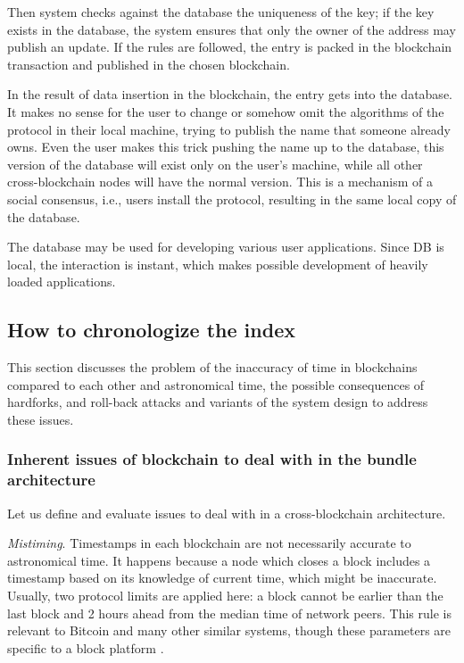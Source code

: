 \begin{multicols}{2}
Then system checks against the database the uniqueness of the key; if the key exists in the database, the system ensures that only the owner of the address may publish an update. If the rules are followed, the entry is packed in the blockchain transaction and published in the chosen blockchain.

In the result of data insertion in the blockchain, the entry gets into the database. It makes no sense for the user to change or somehow omit the algorithms of the protocol in their local machine, trying to publish the name that someone already owns. Even the user makes this trick pushing the name up to the database, this version of the database will exist only on the user’s machine, while all other cross-blockchain nodes will have the normal version. This is a mechanism of a social consensus, i.e., users install the protocol, resulting in the same local copy of the database.

The database may be used for developing various user applications. Since DB is local, the interaction is instant, which makes possible development of heavily loaded applications.


\subsection{How to chronologize the index}\label{subsec-4.3}

This section discusses the problem of the inaccuracy of time in blockchains compared to each other and astronomical time, the possible consequences of hardforks, and roll-back attacks and variants of the system design to address these issues.

\subsubsection{Inherent issues of blockchain to deal with in the bundle architecture}\label{subsubsec-4.3.1}

Let us define and evaluate issues to deal with in a cross-blockchain architecture.

\textit{Mistiming}. Timestamps in each blockchain are not necessarily accurate to astronomical time. It happens because a node which closes a block includes a timestamp based on its knowledge of current time, which might be inaccurate. Usually, two protocol limits are applied here: a block cannot be earlier than the last block and 2 hours ahead from the median time of network peers. This rule is relevant to Bitcoin and many other similar systems, though these parameters are specific to a block platform \cite{art1-key39}. 


\end{multicols}
